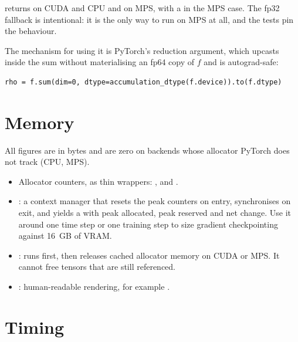  returns  on CUDA and CPU and
 on MPS, with a  in the MPS case. The fp32 fallback is
intentional: it is the only way to run on MPS at all, and the tests pin the behaviour.

The mechanism for using it is PyTorch's reduction  argument, which upcasts
inside the sum without materialising an fp64 copy of $f$ and is autograd-safe:
\begin{lstlisting}[style=py]
rho = f.sum(dim=0, dtype=accumulation_dtype(f.device)).to(f.dtype)
\end{lstlisting}


\section{Memory}

All figures are in bytes and are zero on backends whose allocator PyTorch does not track
(CPU, MPS).
\begin{itemize}[nosep]
\item Allocator counters, as thin wrappers: ,\newline
       and .
\item {}: a context manager that resets the peak counters on
      entry, synchronises on exit, and yields a  with peak allocated, peak
      reserved and net change. Use it around one time step or one training step to size
      gradient checkpointing against \SI{16}{GB} of VRAM.
\item {}: runs  first, then releases cached
      allocator memory on CUDA or MPS. It cannot free tensors that are still referenced.
\item {}: human-readable rendering, for example .
\end{itemize}


\section{Timing}

